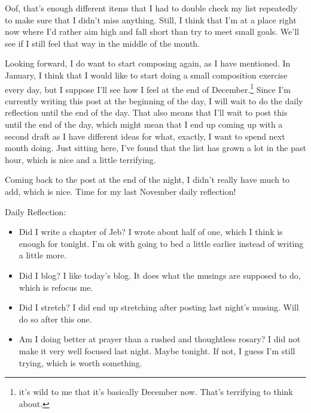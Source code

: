 \documentclass[12pt]{article}[titlepage]
\renewcommand{\,}{\textsuperscript{,}}
\begin{document}
Oof, that's enough different items that I had to double check my list repeatedly to make sure that I didn't miss anything.
Still, I think that I'm at a place right now where I'd rather aim high and fall short than try to meet small goals.
We'll see if I still feel that way in the middle of the month.
 
Looking forward, I do want to start composing again, as I have mentioned.
In January, I think that I would like to start doing a small composition exercise every day, but I suppose I'll see how I feel at the end of December.\footnote{it's wild to me that it's basically December now. That's terrifying to think about.}
Since I'm currently writing this post at the beginning of the day, I will wait to do the daily reflection until the end of the day.
That also means that I'll wait to post this until the end of the day, which might mean that I end up coming up with a second draft as I have different ideas for what, exactly, I want to spend next month doing.
Just sitting here, I've found that the list has grown a lot in the past hour, which is nice and a little terrifying.
 
Coming back to the post at the end of the night, I didn't really have much to add, which is nice.
Time for my last November daily reflection!
 
Daily Reflection:
\begin{itemize}
\item Did I write a chapter of Jeb? I wrote about half of one, which I think is enough for tonight. I'm ok with going to bed a little earlier instead of writing a little more. 
\item Did I blog? I like today's blog. It does what the musings are supposed to do, which is refocus me. 
\item Did I stretch? I did end up stretching after posting last night's musing. Will do so after this one. 
\item Am I doing better at prayer than a rushed and thoughtless rosary? I did not make it very well focused last night. Maybe tonight.
If not, I guess I'm still trying, which is worth something. 
\end{itemize}
\end{document}
